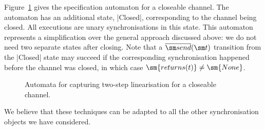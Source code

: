 Figure~\ref{fig:two-step-closeable-chan} gives the specification automaton for
a closeable channel.  The automaton has an additional state, |Closed|,
corresponding to the channel being closed.  All executions are unary
synchronisations in this state.  This automaton represents a simplification
over the general approach discussed above: we do not need two separate states
after closing.  Note that a $\overline{\send}(\sm t)$ transition from the
|Closed| state may succeed if the corresponding synchronisation happened
before the channel was closed, in which case $\sm{returns(t)} \ne \sm{None}$.


\begin{figure}
\begin{center}
\end{center}
\caption{Automata for capturing two-step linearisation for a closeable channel.}
\label{fig:two-step-closeable-chan}
\end{figure}




We believe that these techniques can be adapted to all the other
synchronisation objects we have considered.

